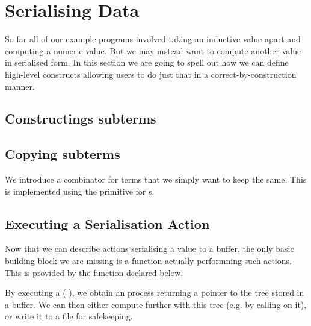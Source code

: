 \section{Serialising Data}\label{sec:serialising}

So far all of our example programs involved taking an inductive value
apart and computing a numeric value.
%
But we may instead want to compute another value in serialised form.
%
In this section we are going to spell out how we can define high-level
constructs allowing users to do just that in a correct-by-construction
manner.





\subsection{Constructings subterms}


\subsection{Copying subterms}

We introduce a  combinator for terms that we simply want
to keep the same. This is implemented using the 
primitive for s.


\subsection{Executing a Serialisation Action}

Now that we can describe actions serialising a value to a buffer,
the only basic building block we are missing is a function actually
performning such actions.
%
This is provided by the  function
declared below.


By executing a (  ), we
obtain an  process returning a pointer to the tree 
stored in a buffer.
%
We can then either compute further with this tree (e.g. by calling
 on it), or write it to a file for safekeeping.
